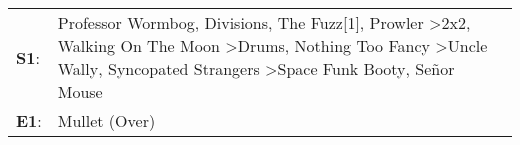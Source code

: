 \begin{supertabular}{p{0.03\textwidth}p{0.92\textwidth}}
 \textbf{S1}:  &  Professor Wormbog\textsuperscript{}, \enspace Divisions\textsuperscript{}, \enspace The Fuzz[1]\textsuperscript{}, \enspace Prowler\textsuperscript{} \textgreater \enspace 2x2\textsuperscript{}, \enspace Walking On The Moon\textsuperscript{} \textgreater \enspace Drums\textsuperscript{}, \enspace Nothing Too Fancy\textsuperscript{} \textgreater \enspace Uncle Wally\textsuperscript{}, \enspace Syncopated Strangers\textsuperscript{} \textgreater \enspace Space Funk Booty\textsuperscript{}, \enspace Señor Mouse\textsuperscript{}  \enspace  \\
 \textbf{E1}:  &                                                                                                                                                                                                                                                                                                                                                                                                                                                                                                                      Mullet (Over)\textsuperscript{}  \enspace  \\
\end{supertabular}
